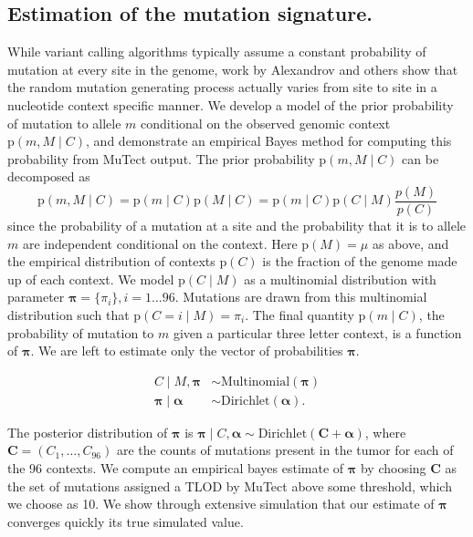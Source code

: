 \documentclass[a4,center,fleqn]{NAR}
\begin{document}
\subsection{Estimation of the mutation signature.}

While variant calling algorithms typically assume a constant probability of mutation at every site in the genome, work by Alexandrov and others show that the random mutation generating process actually varies from site to site in a nucleotide context specific manner.
We develop a model of the prior probability of mutation to allele $m$ conditional on the observed genomic context $\mathrm{p}(m,M \mid C)$, and demonstrate an empirical Bayes method for computing this probability from MuTect output.
The prior probability $\mathrm{p}(m,M \mid C)$ can be decomposed as
$$
\mathrm{p}(m,M \mid C) = \mathrm{p}(m \mid C) \mathrm{p}(M \mid C) = \mathrm{p}(m \mid C) \mathrm{p}(C \mid M)\frac{p(M)}{p(C)}
$$
since the probability of a mutation at a site and the probability that it is to allele $m$ are independent conditional on the context.
Here $\mathrm{p}(M) = \mu$ as above, and the empirical distribution of contexts $\mathrm{p}(C)$ is the fraction of the genome made up of each context.
We model $\mathrm{p}(C \mid M)$ as a multinomial distribution with parameter $\boldsymbol{\pi} = \{\pi_i\}, i = 1\dots96$.
Mutations are drawn from this multinomial distribution such that $\mathrm{p}(C = i \mid M) = \pi_i$.
The final quantity $\mathrm{p}(m \mid C)$, the probability of mutation to $m$ given a particular three letter context, is a function of $\boldsymbol{\pi}$. 
We are left to estimate only the vector of probabilities $\boldsymbol{\pi}$.


$$
\begin{aligned}
C \mid M,\boldsymbol{\pi} & \sim \textrm{Multinomial}(\boldsymbol{\pi})  \\
\boldsymbol{\pi} \mid \boldsymbol{\alpha} &\sim \textrm{Dirichlet}(\boldsymbol{\alpha}).
\end{aligned}
$$

The posterior distribution of $\boldsymbol{\pi}$ is $\boldsymbol{\pi} \mid C,\boldsymbol{\alpha} \sim \textrm{Dirichlet}(\mathbf{C} + \boldsymbol{\alpha})$, where $\mathbf{C} = (C_1,\dots,C_{96})$ are the counts of mutations present in the tumor for each of the 96 contexts.
We compute an empirical bayes estimate of $\boldsymbol{\pi}$ by choosing $\mathbf{C}$ as the set of mutations assigned a TLOD by MuTect above some threshold, which we choose as 10.
We show through extensive simulation that our estimate of $\boldsymbol{\pi}$ converges quickly its true simulated value.
\end{document}
